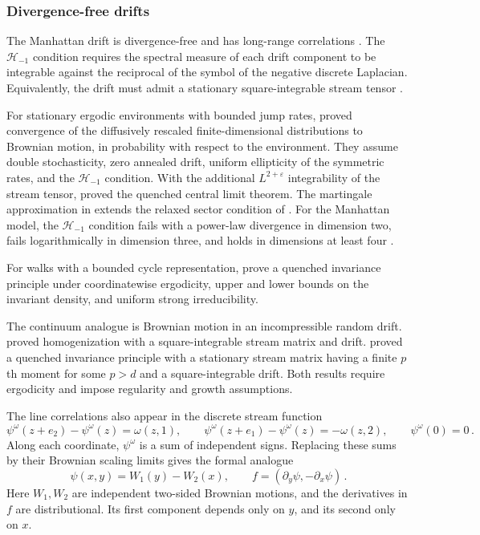 \documentclass[11pt]{amsart}
\theoremstyle{plain}
\theoremstyle{definition}
\newcommand{\1}{\mathbf 1}
\newcommand{\Hs}{\mathcal H}
\begin{document}
\subsubsection{Divergence-free drifts}\label{sssec:divfree}

The Manhattan drift is divergence-free and has long-range correlations
\citep*[p.~2506]{BGKPR90}.  The $\Hs_{-1}$ condition requires the spectral
measure of each drift component to be
integrable against the reciprocal of the symbol of the negative discrete
Laplacian.  Equivalently, the drift must admit a stationary
square-integrable stream tensor
\citep*[(10) and Proposition~1\textup{(ii)}]{Tot18}.

For stationary ergodic environments with bounded jump rates,
\citet*[Theorem~1]{KT17} proved convergence of the diffusively rescaled
finite-dimensional distributions to Brownian motion, in probability with
respect to the environment.  They assume double stochasticity, zero
annealed drift, uniform ellipticity of the symmetric rates, and the
$\Hs_{-1}$ condition.  With the additional $L^{2+\varepsilon}$ integrability of the
stream tensor, \citet*[Theorem~1\textup{(ii)}]{Tot18Q} proved the quenched
central limit theorem.  The martingale approximation in
\citet*[Theorem~RSC2]{KT17} extends the relaxed sector condition of
\citet*[Theorem~1]{HTV12}.
For the Manhattan model, the $\Hs_{-1}$ condition
fails with a power-law divergence in dimension two, fails logarithmically
in dimension three, and holds in dimensions at least four
\citep*[Section~1.4]{Tot18}.

For walks with a bounded cycle representation,
\citet*[Theorem~1.1 and assumptions~\textup{(a)--(c)}, p.~575]{DK08} prove
a quenched invariance principle under coordinatewise ergodicity, upper and
lower bounds on the invariant density, and uniform strong irreducibility.

The continuum analogue is Brownian motion in an incompressible random
drift.  \citet*[Theorem~1 and (1.2)--(1.5)]{Oel88} proved homogenization
with a square-integrable stream matrix and drift.
\citet*[Theorem~1\textup{(ii)}, pp.~1874--1877]{FK97} proved a quenched
invariance principle with a stationary stream matrix having a finite $p$th
moment for some $p>d$ and a square-integrable drift.  Both results require ergodicity and impose regularity and growth
assumptions.

The line correlations also appear in the discrete stream function
\begin{equation}\label{eq:stream}
  \psi^\omega(z+e_2)-\psi^\omega(z)=\omega(z,1),
  \qquad
  \psi^\omega(z+e_1)-\psi^\omega(z)=-\omega(z,2),
  \qquad \psi^\omega(0)=0\, .
\end{equation}
Along each coordinate, $\psi^\omega$ is a sum of independent signs.
Replacing these sums by their Brownian scaling limits gives the formal
analogue
\[
  \psi(x,y)=W_1(y)-W_2(x),
  \qquad f=(\partial_y\psi,-\partial_x\psi)\, .
\]
Here $W_1,W_2$ are independent two-sided Brownian motions, and the
derivatives in $f$ are distributional.  Its first component depends only
on $y$, and its second only on $x$.
\end{document}
